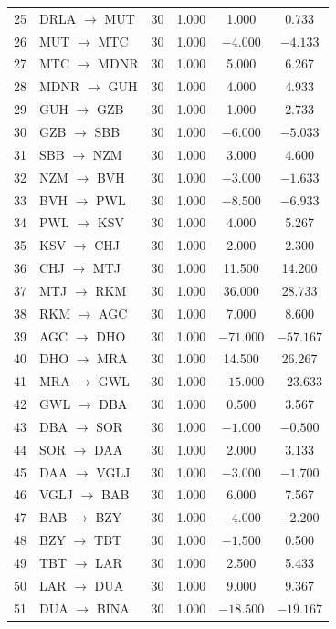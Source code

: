 \documentclass[a4paper,fleqn]{cas-dc}
\begin{document}
\begin{table}[width=\textwidth,pos=t]
\begin{tabular*}{\tblwidth}{@{\extracolsep{\fill}}r l c c c c@{}}
25 & DRLA $\to$ MUT & 30 & 1.000 &   1.000 &   0.733 \\
26 & MUT $\to$ MTC  & 30 & 1.000 &  $-4.000$ &  $-4.133$ \\
27 & MTC $\to$ MDNR & 30 & 1.000 &   5.000 &   6.267 \\
28 & MDNR $\to$ GUH & 30 & 1.000 &   4.000 &   4.933 \\
29 & GUH $\to$ GZB  & 30 & 1.000 &   1.000 &   2.733 \\
30 & GZB $\to$ SBB  & 30 & 1.000 &  $-6.000$ &  $-5.033$ \\
31 & SBB $\to$ NZM  & 30 & 1.000 &   3.000 &   4.600 \\
32 & NZM $\to$ BVH  & 30 & 1.000 &  $-3.000$ &  $-1.633$ \\
33 & BVH $\to$ PWL  & 30 & 1.000 &  $-8.500$ &  $-6.933$ \\
34 & PWL $\to$ KSV & 30 & 1.000 &   4.000 &   5.267 \\
35 & KSV $\to$ CHJ & 30 & 1.000 &   2.000 &   2.300 \\
36 & CHJ $\to$ MTJ & 30 & 1.000 &  11.500 &  14.200 \\
37 & MTJ $\to$ RKM & 30 & 1.000 &  36.000 &  28.733 \\
38 & RKM $\to$ AGC & 30 & 1.000 &   7.000 &   8.600 \\
39 & AGC $\to$ DHO & 30 & 1.000 & $-71.000$ & $-57.167$ \\
40 & DHO $\to$ MRA & 30 & 1.000 &  14.500 &  26.267 \\
41 & MRA $\to$ GWL & 30 & 1.000 & $-15.000$ & $-23.633$ \\
42 & GWL $\to$ DBA & 30 & 1.000 &   0.500 &   3.567 \\
43 & DBA $\to$ SOR & 30 & 1.000 &  $-1.000$ &  $-0.500$ \\
44 & SOR $\to$ DAA & 30 & 1.000 &   2.000 &   3.133 \\
45 & DAA $\to$ VGLJ & 30 & 1.000 &  $-3.000$ &  $-1.700$ \\
46 & VGLJ $\to$ BAB & 30 & 1.000 &   6.000 &   7.567 \\
47 & BAB $\to$ BZY & 30 & 1.000 &  $-4.000$ &  $-2.200$ \\
48 & BZY $\to$ TBT & 30 & 1.000 &  $-1.500$ &   0.500 \\
49 & TBT $\to$ LAR & 30 & 1.000 &   2.500 &   5.433 \\
50 & LAR $\to$ DUA & 30 & 1.000 &   9.000 &   9.367 \\
51 & DUA $\to$ BINA & 30 & 1.000 & $-18.500$ & $-19.167$ \\

\end{tabular*}
\end{table}
\end{document}
